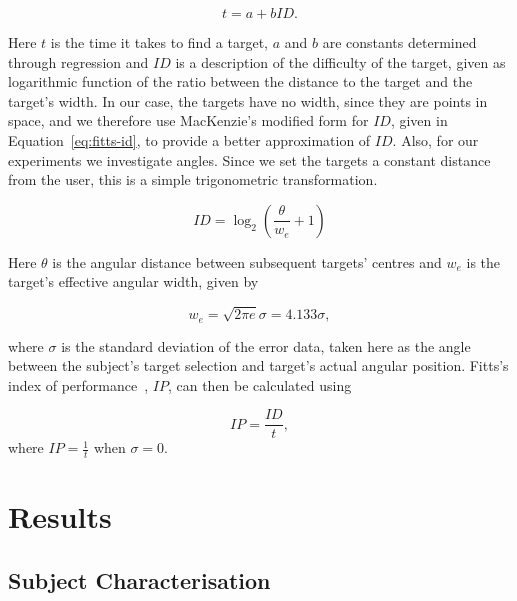 \documentclass[format=sigconf, review=true, screen=true, anonymous=true]{acmart}
\begin{document}
\begin{equation}
  \label{eq:fitts-base}
  t = a + bID.%
\end{equation}


Here $t$ is the time it takes to find a target, $a$ and $b$ are constants determined through regression and $ID$ is a description of the difficulty of the target, given as logarithmic function of the ratio between the distance to the target and the target's width. In our case, the targets have no width, since they are points in space, and we therefore use MacKenzie's modified form for $ID$, given in Equation~\ref{eq:fitts-id}, to provide a better approximation of $ID$. Also, for our experiments we investigate angles. Since we set the targets a constant distance from the user, this is a simple trigonometric transformation.

\begin{equation}
  \label{eq:fitts-id}
  ID = \log_2\left(\frac{\theta}{w_e} + 1\right)
\end{equation}

Here $\theta$ is the angular distance between subsequent targets' centres and $w_e$ is the target's effective angular width, given by

\begin{equation}
  \label{eq:fitts-we}
  w_e = \sqrt{2\pi e}\sigma = 4.133\sigma,
\end{equation}

\noindent
where $\sigma$ is the standard deviation of the error data, taken here as the angle between the subject's target selection and target's actual angular position. Fitts's index of performance~\cite[p.~390]{fitts1954information}, $IP$, can then be calculated using 

\begin{equation}
  \label{eq:fitts-performance}
  IP = \frac{ID}{t},
\end{equation}
\noindent
where $IP = \frac{1}{t}$ when $\sigma=0$.

\section{Results}
\label{sec:results}

\subsection{Subject Characterisation}
\label{sec:character}
\end{document}
